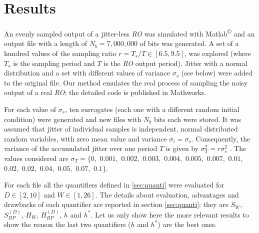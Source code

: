 \section{Results}
\label{sec:resu}

An evenly sampled output of a jitter-less \emph{RO} was simulated with Matlab\textsuperscript{\copyright} and an output file with a length of $N_b=7,000,000$ of bits was generated. A set of a hundred values of the sampling ratio $r= T_s/T\in[6.5,9.5]$, was explored (where $T_s$ is the sampling period and $T$ is the \emph{RO}  output period). Jitter with a normal distribution and a set with different values of variance $\sigma_s$ (see below) were added to the original file. Our method emulates the real process of sampling the noisy output of a real \emph{RO}; the detailed code is published in Mathworks\cite{MathworksMaxi}.

For each value of $\sigma_s$, ten surrogates (each one with a different random initial condition) were generated and new files with $N_b$ bits each were stored. It was assumed that jitter of individual samples is independent, normal distributed random variables, with zero mean value and variance $\sigma_i=\sigma_s$. Consequently, the variance of the accumulated jitter over one period $T$ is given by $\sigma^2_T=r \sigma^2_s$ \cite{Valtchanov2008}. The values considered  are $\sigma_T=\{0,$ $0.001,$ $0.002,$ $0.003,$ $0.004,$ $0.005,$ $0.007,$ $0.01,$ $0.02,$ $0.02,$ $0.04,$ $0.05,$ $0.07,$ $0.1\}$.

For each file all the quantifiers defined in \ref{sec:quanti} were evaluated for $D\in[2,10]$ and $W\in[1,26]$. The details about evaluation, advantages and drawbacks of each quantifier are reported in section \ref{sec:quanti}: they are $S_W$, $S^{(D)}_{BP}$, $H_{W}$, $H^{(D)}_{BP}$, $h$ and $h^*$.  Let us only show here the  more relevant results  to show the reason the last two quantifiers ($h$ and $h^*$) are the best ones.

